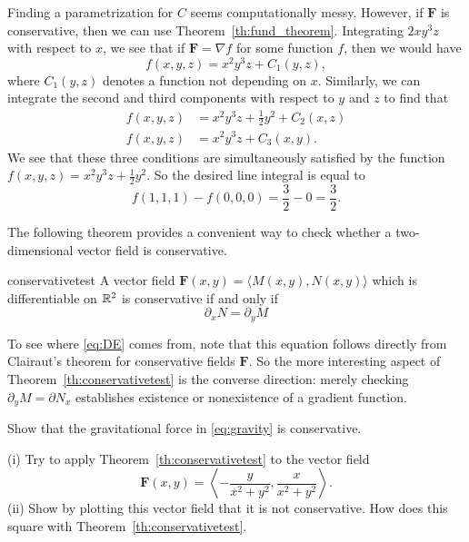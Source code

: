 \documentclass[svgnames]{watsonbook}
\begin{document}
\begin{solution}
  Finding a parametrization for $C$ seems computationally messy.
  However, if $\mathbf{F}$ is conservative, then we can use
  Theorem~\ref{th:fund_theorem}. Integrating $2  x y^{3} z$ with
  respect to $x$, we see that if $\mathbf{F} = \nabla f$ for some
  function $f$, then we would have 
  \[
    f(x,y,z) = x^2 y^3 z + C_1(y,z), 
  \]
  where $C_1(y,z)$ denotes a function not depending on $x$. Similarly,
  we can integrate the second and third components with respect to $y$
  and $z$ to find that
  \begin{align*}
    f(x,y,z) &= x^2 y^3 z + \frac{1}{2}y^2 + C_2(x,z) \\
    f(x,y,z) &= x^2 y^3 z + C_3(x,y). 
  \end{align*}
  We see that these three conditions are simultaneously satisfied by
  the function $f(x,y,z) = x^2 y^3 z + \tfrac{1}{2}y^2$. So the
  desired line integral is equal to 
  \[
    f(1,1,1) - f(0,0,0) = \frac{3}{2} - 0  = \boxed{\frac{3}{2}}. 
  \]
\end{solution}

The following theorem provides a convenient way to check whether a
two-dimensional vector field is conservative. 

\begin{theo}{}{conservativetest}
  A vector field $\mathbf{F}(x,y) = \langle M(x,y), N(x,y)\rangle$
  which is differentiable on $\mathbb{R}^2$ is
  conservative if and only if
  \begin{equation} \label{eq:DE}
    \partial_x N = \partial_y M
  \end{equation}
\end{theo}
To see where \eqref{eq:DE} comes from, note that this equation follows directly
from Clairaut's theorem for conservative fields $\mathbf{F}$. 
So the more interesting aspect of Theorem~\ref{th:conservativetest} is
the converse direction: merely checking $\partial_y M = \partial N_x$
establishes existence or nonexistence of a gradient function. 

\begin{exercise}{}{}
  Show that the gravitational force in \eqref{eq:gravity} is
  conservative.
\end{exercise}

\begin{exercise}{}{}
  (i) Try to apply Theorem~\ref{th:conservativetest}  to the vector
  field
  \[
    \mathbf{F}(x,y) = \left\langle
      -\frac{y}{{x^2+y^2}},
      \frac{x}{{x^2+y^2}}
    \right\rangle. 
  \]  
  (ii) Show by plotting this vector field that it is not
  conservative. How does this square with Theorem~\ref{th:conservativetest}. 
\end{exercise}
\end{document}
